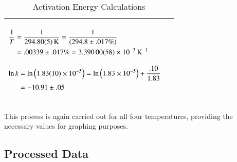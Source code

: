 \begin{table}[h!]
\begin{tabularx}{\textwidth}{|X|X|}
{$\!\begin{aligned}
	\frac{1}{T} &= \frac{1}{\SI{294.8 \pm .05}{\kelvin}} = \frac{1}{(294.8 \pm .017\%)} \\
	&=  .00339 \pm .017\% = \SI{3.39\pm.00058e-3}{\per\kelvin}
	\end{aligned}$} 

\rule{0pt}{3ex}   

{$\!\begin{aligned}
	\ln{k} &= \ln{\left(\num{1.83\pm.10e-5}\right)} = \ln{\left(\num{1.83e-5}\right)} + \frac{.10}{1.83} \\
	&= -10.91 \pm .05
	\end{aligned}$} \\

\hline
\end{tabularx}
\caption{Activation Energy Calculations}
\label{table:activation_energy_calculations}
\end{table}

This process is again carried out for all four temperatures, providing the necessary values for graphing purposes.

\subsection{Processed Data}


